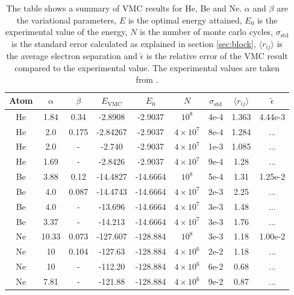 \documentclass[aps,prc,twocolumn,floatfix]{revtex4}
\begin{document}
\begin{widetext}

\begin{table}
\centering
 \begin{tabular}{|ccccccccc|}
  \hline
  Atom & $\alpha$ & $\beta$ & $E_\text{VMC}$ & $E_0$ & $N$ & $\sigma_\text{std}$ & $\langle r_{ij} \rangle$ & $\tilde{\epsilon}$ \\
  \hline 
  He & 1.84 & 0.34 & -2.8908 & -2.9037 & $10^8$ & 4e-4 & 1.363 & 4.44e-3\\
  He & 2.0 & 0.175 & -2.84267 & -2.9037 & $4\times 10^7$ & 8e-4 & 1.284 & ... \\
  He & 2.0 & - & -2.740 & -2.9037 & $4\times 10^7$ & 1e-3 & 1.085 & ...  \\
  He & 1.69 & - & -2.8426 & -2.9037 & $4\times 10^7$ & 9e-4 & 1.28 & ... \\
  Be & 3.88 & 0.12 & -14.4827 & -14.6664 & $10^8$ & 5e-4 & 1.31 &  1.25e-2\\
  Be & 4.0 & 0.087 & -14.4743 & -14.6664 & $4\times 10^7$ & 2e-3 & 2.25 & ...  \\
  Be & 4.0 & - & -13.696 & -14.6664 & $4\times 10^7$ & 3e-3 & 1.48 & ...  \\
  Be & 3.37 & - & -14.213 & -14.6664 & $4\times 10^7$ & 3e-3 & 1.76 & ...  \\
  Ne & 10.33 & 0.073 & -127.607 & -128.884 & $10^8$ & 3e-3 & 1.18 & 1.00e-2\\
  Ne & 10 & 0.104 & -127.63 & -128.884 & $4\times 10^6$ & 2e-2  & 1.18 & ...\\
  Ne & 10 & - & -112.20 & -128.884 & $4\times 10^6$ & 6e-2 & 0.68 & ...\\
  Ne & 7.81 & - & -121.88 & -128.884 & $4\times 10^6$ & 9e-2 & 0.87 & ...\\
  \hline
 \end{tabular}

 \caption{The table shows a summary of VMC results for He, Be and Ne. $\alpha$ and $\beta$ are the variational parameters, $E$ is the optimal energy attained, $E_0$ is the experimental value of the energy, $N$ is the number of monte carlo cycles,   $\sigma_{\text{std}}$ is the standard error calculated as explained in section \ref{sec:block}, $\langle r_{ij} \rangle$ is the average electron separation and $\tilde{\epsilon}$ is the relative error of the VMC result compared to the experimental value. The experimental values are taken from \cite{lervaag10}.}
 \label{tab:3}
 \end{table}


\end{widetext}
\end{document}
